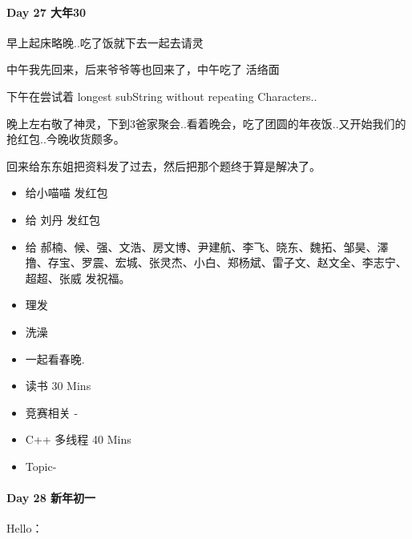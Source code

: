 \documentclass[UTF8,a4paper,8pt]{ctexart}
\begin{document}
     \paragraph{Day 27  大年30    \quad     }
	     早上起床略晚..吃了饭就下去一起去请灵
	     
	     中午我先回来，后来爷爷等也回来了，中午吃了 活络面
	     
	     下午在尝试着 longest subString without repeating Characters..
	     
	     晚上左右敬了神灵，下到3爸家聚会..看着晚会，吃了团圆的年夜饭..又开始我们的抢红包..今晚收货颇多。
	     
	     回来给东东姐把资料发了过去，然后把那个题终于算是解决了。
	     \begin{itemize}
	     		\item  \makebox[0pt][l]{$\square$}\raisebox{.15ex}{\hspace{0.1em}$\checkmark$} 给小喵喵 发红包
	     		\item  \makebox[0pt][l]{$\square$}\raisebox{.15ex}{\hspace{0.1em}$\checkmark$} 给 刘丹  发红包
	     		\item  \makebox[0pt][l]{$\square$}\raisebox{.15ex}{\hspace{0.1em}$\checkmark$} 给 郝楠、候、强、文浩、房文博、尹建航、李飞、晓东、魏拓、邹昊、澤撸、存宝、罗震、宏城、张灵杰、小白、郑杨斌、雷子文、赵文全、李志宁、超超、张威 发祝福。
	     		\item  \makebox[0pt][l]{$\square$}\raisebox{.15ex}{\hspace{0.1em}$\checkmark$} 理发
	     		\item   洗澡
	     		\item  \makebox[0pt][l]{$\square$}\raisebox{.15ex}{\hspace{0.1em}$\checkmark$} 一起看春晚.
	     		
	     		\item   读书  30 Mins		 	 
	     		\item  \makebox[0pt][l]{$\square$}\raisebox{.15ex}{\hspace{0.1em}$\checkmark$} 竞赛相关 - 
	     		\item   C++ 多线程  40 Mins
	     		
	     		\item  Topic-
	     	\end{itemize}
     \paragraph{Day 28  新年初一  \quad     }
	     Hello：
	     
\end{document}
